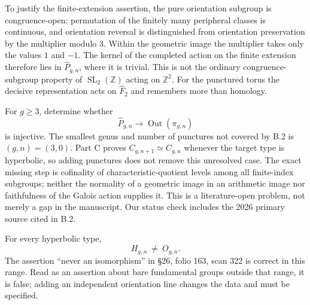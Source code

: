 To justify the finite-extension assertion, the pure orientation subgroup
is congruence-open: permutation of the finitely many peripheral classes
is continuous, and orientation reversal is distinguished from
orientation preservation by the multiplier modulo $3$.  Within the
geometric image the multiplier takes only the values $1$ and $-1$.
The kernel of the completed action on the finite extension therefore
lies in $\widehat P_{g,n}$, where it is trivial.  This is not the ordinary
congruence-subgroup property of $\operatorname{SL}_2(\mathbb Z)$ acting
on $\mathbb Z^2$.  For the punctured torus the decisive representation
acts on $\widehat F_2$ and remembers more than homology.

For $g\geq3$, determine whether
\[
 \widehat P_{g,n}\longrightarrow
 \operatorname{Out}(\pi_{g,n})
\]
is injective.  The smallest genus and number of punctures not covered
by B.2 is $(g,n)=(3,0)$.  Part C proves
$C_{g,n+1}\simeq C_{g,n}$ whenever the target type is hyperbolic, so
adding punctures does not remove this unresolved case.  The exact
missing step is cofinality of characteristic-quotient levels among
all finite-index subgroups; neither the normality of a geometric image
in an arithmetic image nor faithfulness of the Galois action supplies
it.  This is a literature-open problem, not merely a gap in the
manuscript.  Our status check includes the 2026 primary source cited in
B.2.

For every hyperbolic type,
\[
 H_{g,n}\ \ne\ O_{g,n}.
\]
The assertion ``never an isomorphism'' in \S26, folio 163, scan 322
is correct in this range.  Read as an assertion about bare
fundamental groups outside that range, it is false; adding an
independent orientation line changes the data and must be specified.

